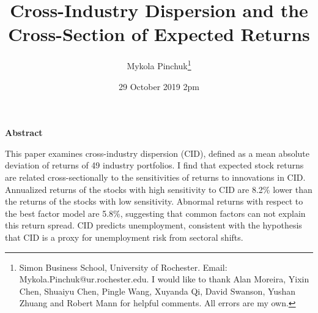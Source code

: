 \documentclass[12pt]{article}
\begin{document}
\onehalfspacing      %
\renewcommand{\footnote}{\endnote}  %

\author{\large{Mykola Pinchuk}\thanks{\rm Simon Business School, University of Rochester. Email: Mykola.Pinchuk@ur.rochester.edu. \newline I would like to thank Alan Moreira, Yixin Chen, Shuaiyu Chen, Pingle Wang, Xuyanda Qi, David Swanson, Yushan Zhuang and Robert Mann for helpful comments. All errors are my own.}}

\title{\bf Cross-Industry Dispersion and the Cross-Section of Expected Returns}

\date{29 October 2019 2pm}  

\maketitle
\thispagestyle{empty}

\bigskip

\normalsize
\vspace{1cm}

\centerline{\bf Abstract}

\vspace{0.5cm}

\begin{onehalfspace}  %
  \noindent This paper examines cross-industry dispersion (CID), defined as a mean absolute deviation of returns of 49 industry portfolios. I find that expected stock returns are related cross-sectionally to the sensitivities of returns to innovations in CID. Annualized returns of the stocks with high sensitivity to CID are 8.2\% lower than the returns of the stocks with low sensitivity. Abnormal returns with respect to the best factor model are 5.8\%, suggesting that common factors can not explain this return spread. CID predicts unemployment, consistent with the hypothesis that CID is a proxy for unemployment risk from sectoral shifts. 
\end{onehalfspace}
\medskip


\clearpage
{}
\end{document}
